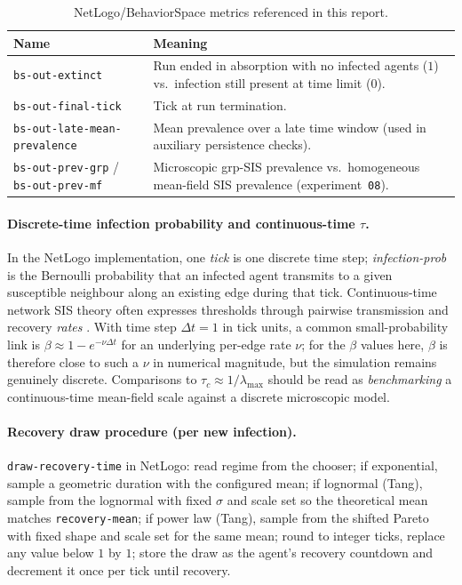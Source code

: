 \documentclass[11pt,a4paper]{article}
\begin{document}
\begin{table}[H]
  \centering
  \small
  \caption{NetLogo/BehaviorSpace metrics referenced in this report.}
  \label{tab:netlogo-cols}
  \begin{tabularx}{\linewidth}{@{}l X@{}}
    \toprule
    \textbf{Name} & \textbf{Meaning} \\
    \midrule
    \texttt{bs-out-extinct} & Run ended in absorption with no infected agents ($1$) vs.\ infection still present at time limit ($0$). \\
    \texttt{bs-out-final-tick} & Tick at run termination. \\
    \texttt{bs-out-late-mean-prevalence} & Mean prevalence over a late time window (used in auxiliary persistence checks). \\
    \texttt{bs-out-prev-grp} / \texttt{bs-out-prev-mf} & Microscopic grp-SIS prevalence vs.\ homogeneous mean-field SIS prevalence (experiment~\texttt{08}). \\
    \bottomrule
  \end{tabularx}
\end{table}

\paragraph{Discrete-time infection probability and continuous-time $\tau$.}
In the NetLogo implementation, one \emph{tick} is one discrete time step; \emph{infection-prob} is the Bernoulli probability that an infected agent transmits to a given susceptible neighbour along an existing edge during that tick. Continuous-time network SIS theory often expresses thresholds through pairwise transmission and recovery \emph{rates} \cite{VanMieghem2011,PastorSatorras2015}. With time step $\Delta t=1$ in tick units, a common small-probability link is $\beta \approx 1-e^{-\nu \Delta t}$ for an underlying per-edge rate $\nu$; for the $\beta$ values here, $\beta$ is therefore close to such a $\nu$ in numerical magnitude, but the simulation remains genuinely discrete. Comparisons to $\tau_c\approx 1/\lambda_{\max}$ should be read as \emph{benchmarking} a continuous-time mean-field scale against a discrete microscopic model.

\paragraph{Recovery draw procedure (per new infection).}
\texttt{draw-recovery-time} in NetLogo: read regime from the chooser; if exponential, sample a geometric duration with the configured mean; if lognormal (Tang), sample from the lognormal with fixed $\sigma$ and scale set so the theoretical mean matches \texttt{recovery-mean}; if power law (Tang), sample from the shifted Pareto with fixed shape and scale set for the same mean; round to integer ticks, replace any value below $1$ by $1$; store the draw as the agent's recovery countdown and decrement it once per tick until recovery.
\end{document}
